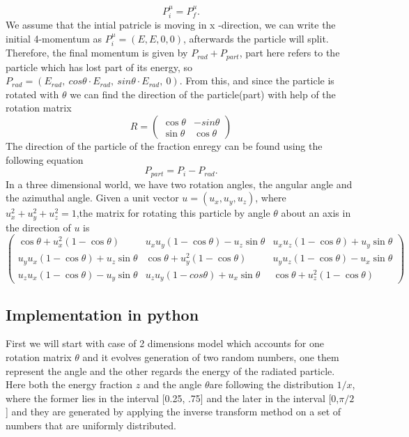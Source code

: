 \begin{equation}
P_{i}^{\mu} = P_f^{\mu}.
\end{equation} 
We assume that the intial patricle is moving in x -direction, we can write the initial 4-momentum as $P_i^{\mu} = (E,E,0,0)$, afterwards the particle will split. Therefore, the final momentum is given by $P_{rad} + P_{part}$, part here refers to the particle which has lost part of its energy, so $P_{rad} = (E_{rad},\  cos\theta \cdot E_{rad},\  sin\theta \cdot E_{rad},\ 0)$. From this, and since the particle is rotated with $\theta$ we can find the direction of the particle(part) with help of the rotation matrix \begin{equation} R = 
\begin{pmatrix}
\cos\theta & - sin\theta\\
\sin\theta & \cos\theta
\end{pmatrix}
\end{equation} The direction of the particle of the fraction enregy can be found using the following equation  \begin{equation}
P_{part} = P_{i} - P_{rad} .
\end{equation}    
In a three dimensional world, we have two rotation angles, the angular angle and the azimuthal angle. Given a unit vector $u =(u_x, u_y, u_z) $, where $u_x^2 + u_y^2 + u_z^2 = 1$,the matrix for rotating this particle by angle $\theta$ about an axis in the direction of $u$ is   
\begin{equation} 
\begin{pmatrix}
\cos\theta + u^2_x(1-\cos\theta) & u_x u_y (1-\cos\theta) - u_z \sin\theta& u_x u_z(1-\cos\theta)+ u_y \sin\theta\\

u_y u_x (1 - \cos\theta) + u_z \sin\theta & \cos\theta + u_y^2 (1 - \cos\theta) & u_y u_z (1 - \cos\theta) - u_x \sin\theta \\

u_z u_x (1 - \cos\theta) - u_y \sin\theta & u_z u_y (1 - cos\theta) + u_x \sin\theta & \cos\theta + u_z^2 (1 - \cos\theta)
\end{pmatrix}
\end{equation} 
\subsection{Implementation in python}
First we will start with case of 2 dimensions model which accounts for one rotation matrix $\theta$ and it evolves generation of two random numbers, one them represent the angle and the other regards the energy of the radiated particle. Here both the energy fraction $z$ and the angle $\theta$are following the distribution $1/x$, where the former lies in the interval [0.25, .75] and the later in the interval [0,$\pi/2$] and they are generated by applying the inverse transform method on a set of numbers that are uniformly distributed. 

